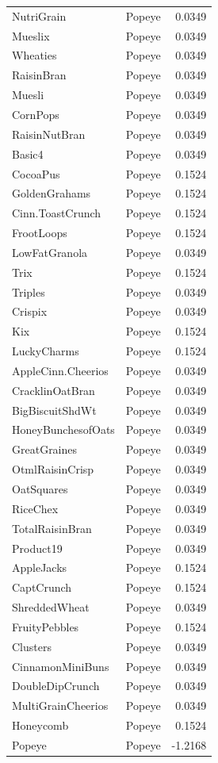 \begin{longtable}{llr}
NutriGrain & Popeye & 0.0349 \\
Mueslix & Popeye & 0.0349 \\
Wheaties & Popeye & 0.0349 \\
RaisinBran & Popeye & 0.0349 \\
Muesli & Popeye & 0.0349 \\
CornPops & Popeye & 0.0349 \\
RaisinNutBran & Popeye & 0.0349 \\
Basic4 & Popeye & 0.0349 \\
CocoaPus & Popeye & 0.1524 \\
GoldenGrahams & Popeye & 0.1524 \\
Cinn.ToastCrunch & Popeye & 0.1524 \\
FrootLoops & Popeye & 0.1524 \\
LowFatGranola & Popeye & 0.0349 \\
Trix & Popeye & 0.1524 \\
Triples & Popeye & 0.0349 \\
Crispix & Popeye & 0.0349 \\
Kix & Popeye & 0.1524 \\
LuckyCharms & Popeye & 0.1524 \\
AppleCinn.Cheerios & Popeye & 0.0349 \\
CracklinOatBran & Popeye & 0.0349 \\
BigBiscuitShdWt & Popeye & 0.0349 \\
HoneyBunchesofOats & Popeye & 0.0349 \\
GreatGraines & Popeye & 0.0349 \\
OtmlRaisinCrisp & Popeye & 0.0349 \\
OatSquares & Popeye & 0.0349 \\
RiceChex & Popeye & 0.0349 \\
TotalRaisinBran & Popeye & 0.0349 \\
Product19 & Popeye & 0.0349 \\
AppleJacks & Popeye & 0.1524 \\
CaptCrunch & Popeye & 0.1524 \\
ShreddedWheat & Popeye & 0.0349 \\
FruityPebbles & Popeye & 0.1524 \\
Clusters & Popeye & 0.0349 \\
CinnamonMiniBuns & Popeye & 0.0349 \\
DoubleDipCrunch & Popeye & 0.0349 \\
MultiGrainCheerios & Popeye & 0.0349 \\
Honeycomb & Popeye & 0.1524 \\
Popeye & Popeye & -1.2168 \\
\end{longtable}
